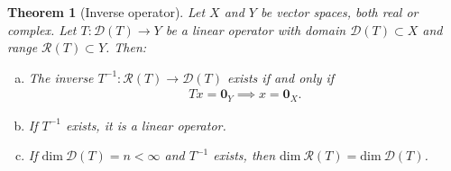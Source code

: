 \documentclass[11pt]{article}
\theoremstyle{mystyle}
\newtheorem{thm}{Theorem}[section]
\newcommand{\0}{\mathbf{0}}
\begin{document}
\begin{thm}[Inverse operator]\label{inverseproperties}
Let $X$ and $Y$ be vector spaces, both real or complex. Let $T: \mathscr{D}(T) \longrightarrow Y$ be a linear operator with domain $\mathscr{D}(T) \subset X$ and range $\mathscr{R}(T) \subset Y$. Then:
\begin{enumerate}[(a)]
    \item The inverse $T^{-1}: \mathscr{R}(T) \longrightarrow \mathscr{D}(T)$ exists if and only if
    \begin{align*}
        Tx = \0_Y \implies x = \0_X.
    \end{align*}
    \item If $T^{-1}$ exists, it is a linear operator.
    \item If $\text{dim} \ \mathscr{D}(T) = n < \infty$ and $T^{-1}$ exists, then $\text{dim} \ \mathscr{R}(T) = \text{dim} \ \mathscr{D}(T)$.
\end{enumerate}
\end{thm}
\end{document}
